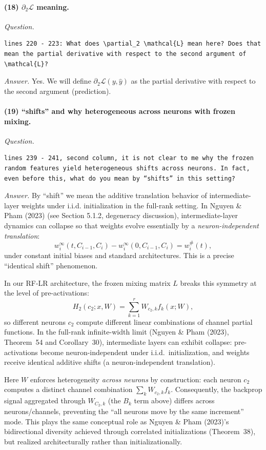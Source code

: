 \documentclass[11pt,a4paper]{article}
\newcommand{\NP}{Nguyen \& Pham (2023)}
\begin{document}
\paragraph{(18) $\partial_2\mathcal{L}$ meaning.}
\textit{Question.}\par
\begin{verbatim}
lines 220 - 223: What does \partial_2 \mathcal{L} mean here? Does that mean the partial derivative with respect to the second argument of \mathcal{L}?
\end{verbatim}
\textit{Answer.} Yes. We will define $\partial_2\mathcal{L}(y,\hat y)$ as the partial derivative with respect to the second argument (prediction).

\paragraph{(19) ``shifts'' and why heterogeneous across neurons with frozen mixing.}
\textit{Question.}\par
\begin{verbatim}
lines 239 - 241, second column, it is not clear to me why the frozen random features yield heterogeneous shifts across neurons. In fact, even before this, what do you mean by “shifts” in this setting?
\end{verbatim}
\textit{Answer.} By ``shift'' we mean the additive translation behavior of intermediate-layer weights under i.i.d. initialization in the full-rank setting. In \NP{} (see Section 5.1.2, degeneracy discussion), intermediate-layer dynamics can collapse so that weights evolve essentially by a \emph{neuron-independent translation}:
\[
w_i^{\infty}(t,C_{i-1},C_i)-w_i^{\infty}(0,C_{i-1},C_i)=w_i^{\#}(t),
\]
under constant initial biases and standard architectures. This is a precise ``identical shift'' phenomenon.

In our RF-LR architecture, the frozen mixing matrix $L$ breaks this symmetry at the level of pre-activations:
\[
H_2(c_2;x,W)=\sum_{k=1}^r W_{c_2,k}f_k(x;W),
\]
so different neurons $c_2$ compute different linear combinations of channel partial functions. In the full-rank infinite-width limit (\NP{}, Theorem~54 and Corollary~30), intermediate layers can exhibit collapse: pre-activations become neuron-independent under i.i.d.\ initialization, and weights receive identical additive shifts (a neuron-independent translation).

Here $W$ enforces heterogeneity \emph{across neurons} by construction: each neuron $c_2$ computes a distinct channel combination $\sum_k W_{c_2,k}f_k$. Consequently, the backprop signal aggregated through $W_{C_2,k}$ (the $B_k$ term above) differs across neurons/channels, preventing the ``all neurons move by the same increment'' mode. This plays the same conceptual role as \NP{}'s bidirectional diversity achieved through correlated initializations (Theorem~38), but realized architecturally rather than initializationally.
\end{document}
